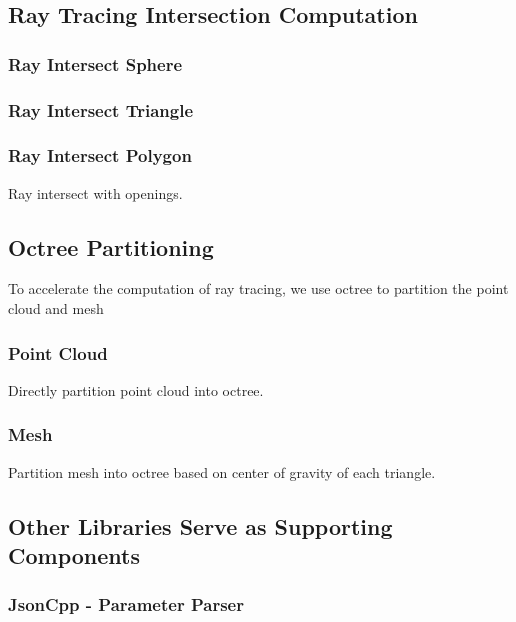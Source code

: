 \documentclass[11pt, a4paper,oneside,chapterprefix=false]{scrbook}
\begin{document}
\subsection{Ray Tracing Intersection Computation} \label{sec:ray tracing}

\subsubsection{Ray Intersect Sphere}

\subsubsection{Ray Intersect Triangle}

\subsubsection{Ray Intersect Polygon}

Ray intersect with openings.

\subsection{Octree Partitioning}

To accelerate the computation of ray tracing, we use octree to partition the point cloud and mesh

\subsubsection{Point Cloud}

Directly partition point cloud into octree.

\subsubsection{Mesh}

Partition mesh into octree based on center of gravity of each triangle.

\subsection{Other Libraries Serve as Supporting Components} \label{sec:supporting libraries}

\subsubsection{JsonCpp - Parameter Parser} \label{subsec:jsoncpp}
\end{document}
